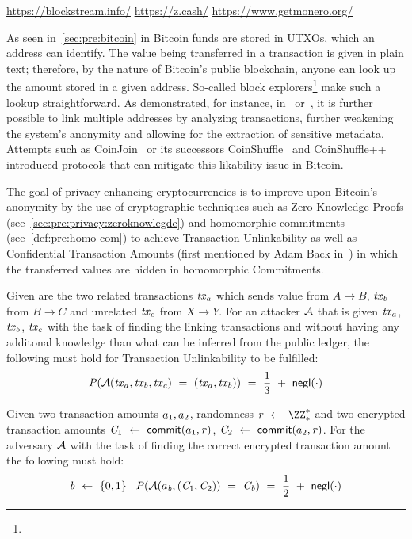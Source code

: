 \urldef\urlblockexp\url{https://blockstream.info/}
\urldef\urlzcash\url{https://z.cash/}
\urldef\urlmonero\url{https://www.getmonero.org/}

As seen in~\cref{sec:pre:bitcoin} in Bitcoin funds are stored in UTXOs, which an address can identify.
The value being transferred in a transaction is given in plain text; therefore, by the nature of Bitcoin’s public blockchain, anyone can look up the amount stored in a given address.
So-called block explorers\footnote{\urlblockexp} make such a lookup straightforward.
As demonstrated, for instance, in~\cite{barber2012bitter} or~\cite{reid2013analysis}, it is further possible to link multiple addresses by analyzing transactions, further weakening the system's anonymity and allowing for the extraction of sensitive metadata.
Attempts such as CoinJoin~\cite{maxwell2013coinjoin} or its successors CoinShuffle~\cite{ruffing2014coinshuffle} and CoinShuffle++~\cite{ruffing2017p2p} introduced protocols that can mitigate this likability issue in Bitcoin.

The goal of privacy-enhancing cryptocurrencies is to improve upon Bitcoin's anonymity by the use of cryptographic techniques such as Zero-Knowledge Proofs (see~\cref{sec:pre:privacy:zeroknowlegde}) and homomorphic commitments (see~\cref{def:pre:homo-com}) to achieve Transaction Unlinkability as well as Confidential Transaction Amounts (first mentioned by Adam Back in~\cite{back2013confidentialtx}) in which the transferred values are hidden in homomorphic Commitments.

\begin{definition} \label{def:pre:privacy:tx-unlink}
    Given are the two related transactions $\mathit{tx}_a$ which sends value from $A \rightarrow B$, $\mathit{tx}_b$ from $B \rightarrow C$ and unrelated $\mathit{tx}_c$ from $X \rightarrow Y$.
For an attacker $\mathcal{A}$ that is given $\mathit{tx}_a$, $\mathit{tx}_b$, $\mathit{tx}_c$ with the task of finding the linking transactions and without having any additonal knowledge than what can be inferred from the public ledger, the following must hold for Transaction Unlinkability to be fulfilled:
    \[ \mathit{P}(\mathcal{A}(\mathit{tx}_a, \mathit{tx}_b, \mathit{tx}_c) ~=~ (\mathit{tx}_a, \mathit{tx}_b)) ~=~ \frac{1}{3} ~+~ \mathsf{negl}(\cdot)\]
\end{definition}

\begin{definition} \label{def:pre:privacy:conf-tx}
    Given two transaction amounts $a_1, a_2$, randomness $\varBlindingFactor \opFunResult \cnstIntegersPrimeWithoutZero{*}$ and two encrypted transaction amounts $\mathit{C}_1 ~\leftarrow~ \mathsf{commit}(a_1, \mathit{r})$, $\mathit{C}_2 ~\leftarrow~ \mathsf{commit}(a_2, \mathit{r})$.
For the adversary $\mathcal{A}$ with the task of finding the correct encrypted transaction amount the following must hold:
    \[ \mathit{b} ~\leftarrow~ \{0,1\} \;\;\; \mathit{P}(\mathcal{A}(a_{\mathit{b}}, (\mathit{C}_1, \mathit{C}_2)) ~=~ \mathit{C}_{\mathit{b}}) ~=~ \frac{1}{2} ~+~ \mathsf{negl}(\cdot) \]
\end{definition}

